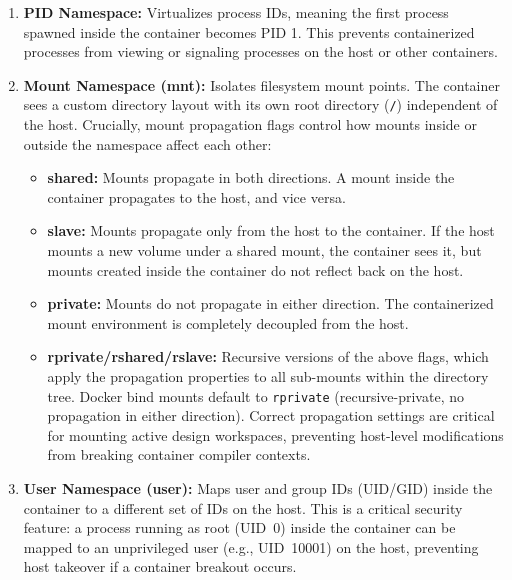 \begin{enumerate}
    \item \textbf{PID Namespace:} Virtualizes process IDs, meaning the first process spawned inside the container becomes PID 1. This prevents containerized processes from viewing or signaling processes on the host or other containers.
    \item \textbf{Mount Namespace (mnt):} Isolates filesystem mount points. The container sees a custom directory layout with its own root directory (\texttt{/}) independent of the host. Crucially, mount propagation flags control how mounts inside or outside the namespace affect each other:
    \begin{itemize}
        \item \textbf{shared:} Mounts propagate in both directions. A mount inside the container propagates to the host, and vice versa.
        \item \textbf{slave:} Mounts propagate only from the host to the container. If the host mounts a new volume under a shared mount, the container sees it, but mounts created inside the container do not reflect back on the host.
        \item \textbf{private:} Mounts do not propagate in either direction. The containerized mount environment is completely decoupled from the host.
        \item \textbf{rprivate/rshared/rslave:} Recursive versions of the above flags, which apply the propagation properties to all sub-mounts within the directory tree. Docker bind mounts default to \texttt{rprivate} (recursive-private, no propagation in either direction). Correct propagation settings are critical for mounting active design workspaces, preventing host-level modifications from breaking container compiler contexts.
    \end{itemize}
    \item \textbf{User Namespace (user):} Maps user and group IDs (UID/GID) inside the container to a different set of IDs on the host. This is a critical security feature: a process running as root (UID~0) inside the container can be mapped to an unprivileged user (e.g., UID~10001) on the host, preventing host takeover if a container breakout occurs.
    

\end{enumerate}
